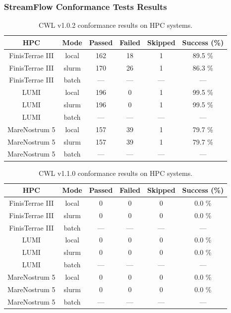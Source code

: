 \documentclass{article}
\begin{document}
\subsubsection*{StreamFlow Conformance Tests Results}
\begin{table}[ht!]
\centering
\setlength{\tabcolsep}{6pt}
\renewcommand{\arraystretch}{1.2}
\begin{tabular}{|c|c|c|c|c|c|}
\hline
\rowcolor{lightgray!50}
\textbf{HPC} & \textbf{Mode} & \textbf{Passed} & \textbf{Failed} & \textbf{Skipped} & \textbf{Success (\%)} \\
\hline
FinisTerrae III & local & 162 & 18 & 1 & 89.5 \% \\
FinisTerrae III & slurm & 170 & 26 & 1 & 86.3 \% \\
FinisTerrae III & batch & — & — & — & — \\
\hline\hline
LUMI & local & 196 & 0 & 1 & 99.5 \% \\
LUMI & slurm & 196 & 0 & 1 & 99.5 \% \\
LUMI & batch & — & — & — & — \\
\hline\hline
MareNostrum 5 & local & 157 & 39 & 1 & 79.7 \% \\
MareNostrum 5 & slurm & 157 & 39 & 1 & 79.7 \% \\
MareNostrum 5 & batch & — & — & — & — \\
\hline
\end{tabular}
\caption{CWL v1.0.2 conformance results on HPC systems.}
\label{tab:streamflow_v10}
\end{table}
\begin{table}[ht!]
\centering
\setlength{\tabcolsep}{6pt}
\renewcommand{\arraystretch}{1.2}
\begin{tabular}{|c|c|c|c|c|c|}
\hline
\rowcolor{lightgray!50}
\textbf{HPC} & \textbf{Mode} & \textbf{Passed} & \textbf{Failed} & \textbf{Skipped} & \textbf{Success (\%)} \\
\hline
FinisTerrae III & local & 0 & 0 & 0 & 0.0 \% \\
FinisTerrae III & slurm & 0 & 0 & 0 & 0.0 \% \\
FinisTerrae III & batch & — & — & — & — \\
\hline\hline
LUMI & local & 0 & 0 & 0 & 0.0 \% \\
LUMI & slurm & 0 & 0 & 0 & 0.0 \% \\
LUMI & batch & — & — & — & — \\
\hline\hline
MareNostrum 5 & local & 0 & 0 & 0 & 0.0 \% \\
MareNostrum 5 & slurm & 0 & 0 & 0 & 0.0 \% \\
MareNostrum 5 & batch & — & — & — & — \\
\hline
\end{tabular}
\caption{CWL v1.1.0 conformance results on HPC systems.}
\label{tab:streamflow_v11}
\end{table}
\end{document}
